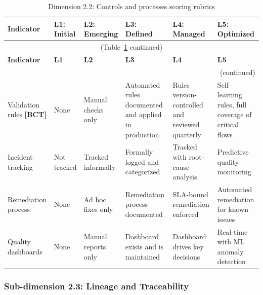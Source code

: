 \begin{center}
{\small
\begin{longtable}{|p{2.4cm}|p{2.0cm}|p{2.0cm}|p{2.2cm}|p{2.2cm}|p{2.2cm}|}
\caption{Dimension 2.2: Controls and processes scoring rubrics}\label{tab:d2-2}\\

\hline
\textbf{Indicator} & \textbf{L1: Initial} & \textbf{L2: Emerging} & \textbf{L3: Defined} & \textbf{L4: Managed} & \textbf{L5: Optimized} \\
\hline
\endfirsthead
\multicolumn{6}{c}{\small (Table~\ref{tab:d2-2} continued)} \\
\hline
\textbf{Indicator} & \textbf{L1} & \textbf{L2} & \textbf{L3} & \textbf{L4} & \textbf{L5} \\
\hline
\endhead
\hline
\multicolumn{6}{r}{\small (continued)} \\
\endfoot
\hline
\endlastfoot
Validation rules \textbf{[BCT]} &
  None &
  Manual checks only &
  Automated rules documented and applied in production &
  Rules version-controlled and reviewed quarterly &
  Self-learning rules, full coverage of critical flows \\
\hline
Incident tracking &
  Not tracked &
  Tracked informally &
  Formally logged and categorized &
  Tracked with root-cause analysis &
  Predictive quality monitoring \\
\hline
Remediation process &
  None &
  Ad hoc fixes only &
  Remediation process documented &
  SLA-bound remediation enforced &
  Automated remediation for known issues \\
\hline
Quality dashboards &
  None &
  Manual reports only &
  Dashboard exists and is maintained &
  Dashboard drives key decisions &
  Real-time with ML anomaly detection \\
\hline
\end{longtable}
}
\end{center}

\subsubsection*{Sub-dimension 2.3: Lineage and Traceability}


